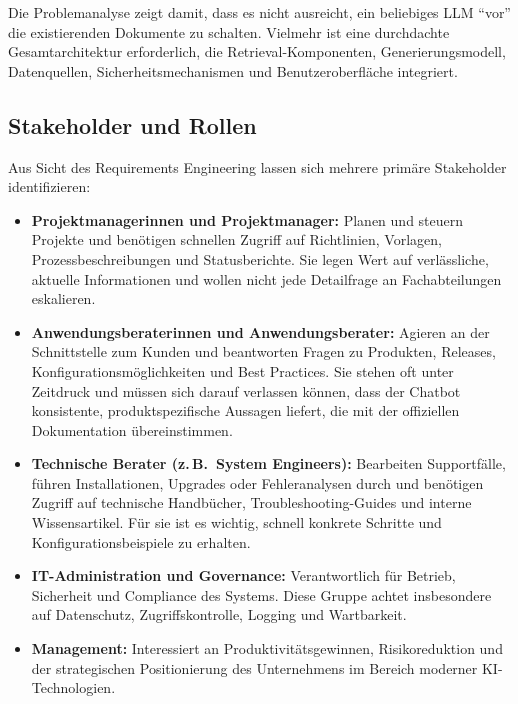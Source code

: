 Die Problemanalyse zeigt damit, dass es nicht ausreicht, ein beliebiges LLM \enquote{vor} die existierenden Dokumente zu schalten.
Vielmehr ist eine durchdachte Gesamtarchitektur erforderlich, die Retrieval-Komponenten, Generierungsmodell, Datenquellen, Sicherheitsmechanismen und Benutzeroberfläche integriert.


\subsection{Stakeholder und Rollen}\label{subsec:stakeholder}

Aus Sicht des Requirements Engineering lassen sich mehrere primäre Stakeholder identifizieren:

\begin{itemize}
    \item \textbf{Projektmanagerinnen und Projektmanager:}
    Planen und steuern Projekte und benötigen schnellen Zugriff auf Richtlinien, Vorlagen, Prozessbeschreibungen und Statusberichte.
    Sie legen Wert auf verlässliche, aktuelle Informationen und wollen nicht jede Detailfrage an Fachabteilungen eskalieren.

    \item \textbf{Anwendungsberaterinnen und Anwendungsberater:}
    Agieren an der Schnittstelle zum Kunden und beantworten Fragen zu Produkten, Releases, Konfigurationsmöglichkeiten und Best Practices.
    Sie stehen oft unter Zeitdruck und müssen sich darauf verlassen können, dass der Chatbot konsistente, produktspezifische Aussagen liefert, die mit der offiziellen Dokumentation übereinstimmen.

    \item \textbf{Technische Berater (z.\,B.\ System Engineers):}
    Bearbeiten Supportfälle, führen Installationen, Upgrades oder Fehleranalysen durch und benötigen Zugriff auf technische Handbücher, Troubleshooting-Guides und interne Wissensartikel.
    Für sie ist es wichtig, schnell konkrete Schritte und Konfigurationsbeispiele zu erhalten.

    \item \textbf{IT-Administration und Governance:}
    Verantwortlich für Betrieb, Sicherheit und Compliance des Systems.
    Diese Gruppe achtet insbesondere auf Datenschutz, Zugriffskontrolle, Logging und Wartbarkeit.

    \item \textbf{Management:}
    Interessiert an Produktivitätsgewinnen, Risikoreduktion und der strategischen Positionierung des Unternehmens im Bereich moderner KI-Technologien.
\end{itemize}

